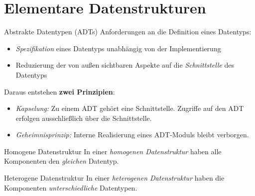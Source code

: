 \section{Elementare Datenstrukturen}

\begin{defi}{Abstrakte Datentypen (ADTs)}
    Anforderungen an die Definition eines Datentyps:
    \begin{itemize}
        \item \emph{Spezifikation} eines Datentyps unabhängig von der Implementierung
        \item Reduzierung der von außen sichtbaren Aspekte auf die \emph{Schnittstelle} des Datentyps
    \end{itemize}

    Daraus entstehen \textbf{zwei Prinzipien}:
    \begin{itemize}
        \item \emph{Kapselung:}
              \subitem Zu einem ADT gehört eine Schnittstelle.
              \subitem Zugriffe auf den ADT erfolgen ausschließlich über die Schnittstelle.
        \item \emph{Geheimnisprinzip:}
              \subitem Interne Realisierung eines ADT-Moduls bleibt verborgen.
    \end{itemize}
\end{defi}

\begin{defi}{Homogene Datenstruktur}
    In einer \emph{homogenen Datenstruktur} haben alle Komponenten den \emph{gleichen} Datentyp.
\end{defi}

\begin{defi}{Heterogene Datenstruktur}
    In einer \emph{heterogenen Datenstruktur} haben die Komponenten \emph{unterschiedliche} Datentypen.
\end{defi}

